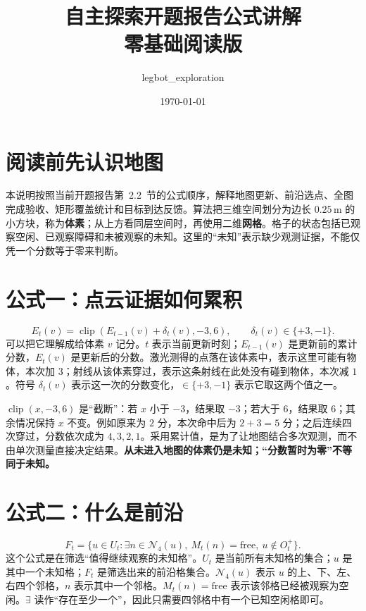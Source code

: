\documentclass[UTF8,12pt,a4paper]{ctexart}
\title{自主探索开题报告公式讲解\\\large 零基础阅读版}
\author{legbot\_exploration}
\date{\today}
\begin{document}
\maketitle

\section*{阅读前先认识地图}
本说明按照当前开题报告第~2.2~节的公式顺序，解释地图更新、前沿选点、全图完成验收、矩形覆盖统计和目标到达反馈。算法把三维空间划分为边长 $0.25\,\mathrm m$ 的小方块，称为\textbf{体素}；从上方看同层空间时，再使用二维\textbf{网格}。格子的状态包括已观察空闲、已观察障碍和未被观察的未知。这里的“未知”表示缺少观测证据，不能仅凭一个分数等于零来判断。

\section{公式一：点云证据如何累积}
\begin{equation}\label{eq:evidence}
E_t(v)=\operatorname{clip}\!\left(E_{t-1}(v)+\delta_t(v),-3,6\right),
\qquad \delta_t(v)\in\{+3,-1\}.
\end{equation}
可以把它理解成给体素 $v$ 记分。$t$ 表示当前更新时刻；$E_{t-1}(v)$ 是更新前的累计分数，$E_t(v)$ 是更新后的分数。激光测得的点落在该体素中，表示这里可能有物体，本次加 $3$；射线从该体素穿过，表示这条射线在此处没有碰到物体，本次减 $1$。符号 $\delta_t(v)$ 表示这一次的分数变化，$\in\{+3,-1\}$ 表示它取这两个值之一。

$\operatorname{clip}(x,-3,6)$ 是“截断”：若 $x$ 小于 $-3$，结果取 $-3$；若大于 $6$，结果取 $6$；其余情况保持 $x$ 不变。例如原来为 $2$ 分，本次命中后为 $2+3=5$ 分；之后连续四次穿过，分数依次成为 $4,3,2,1$。采用累计值，是为了让地图结合多次观测，而不由单次测量直接决定结果。\textbf{从未进入地图的体素仍是未知；“分数暂时为零”不等同于未知。}

\section{公式二：什么是前沿}
\begin{equation}\label{eq:frontier}
F_t=\{u\in U_t:\exists n\in\mathcal N_4(u),\
M_t(n)=\mathrm{free},\ u\notin O_t^{+}\}.
\end{equation}
这个公式是在筛选“值得继续观察的未知格”。$U_t$ 是当前所有未知格的集合；$u$ 是其中一个未知格；$F_t$ 是筛选出来的前沿格集合。$\mathcal N_4(u)$ 表示 $u$ 的上、下、左、右四个邻格，$n$ 表示其中一个邻格。$M_t(n)=\mathrm{free}$ 表示该邻格已经被观察为空闲。$\exists$ 读作“存在至少一个”，因此只需要四邻格中有一个已知空闲格即可。
\end{document}
